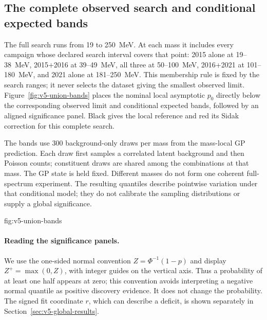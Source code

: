 \subsection{The complete observed search and conditional expected bands}
\label{sec:v5-band-results}

The full search runs from 19 to 250~MeV. At each mass it includes every campaign
whose declared search interval covers that point: 2015 alone at 19--38~MeV,
2015+2016 at 39--49~MeV, all three at 50--100~MeV, 2016+2021 at 101--180~MeV,
and 2021 alone at 181--250~MeV. This membership rule is fixed by the search
ranges; it never selects the dataset giving the smallest observed limit.
Figure~\ref{fig:v5-union-bands} places the nominal local asymptotic $p_0$ directly
below the corresponding observed limit and conditional expected bands, followed
by an aligned significance panel. Black gives the local reference and red its
Sidak correction for this complete search.

The bands use 300 background-only draws per mass from the
mass-local GP prediction. Each draw first samples a correlated latent
background and then Poisson counts; constituent draws are shared among the
combinations at that mass. The GP state is held fixed. Different masses do not
form one coherent full-spectrum experiment. The resulting quantiles describe
pointwise variation under that conditional model; they do not calibrate the
\CLs{} sampling distributions or supply a global significance.

{fig:v5-union-bands}

\paragraph{Reading the significance panels.}
We use the one-sided normal convention $Z=\Phi^{-1}(1-p)$ and display
$Z^+=\max(0,Z)$, with integer guides on the vertical axis. Thus a probability
of at least one half appears at zero; this convention avoids interpreting a
negative normal quantile as positive discovery evidence. It does not change
the probability. The signed fit coordinate $r$, which can describe a deficit,
is shown separately in Section~\ref{sec:v5-global-results}.

